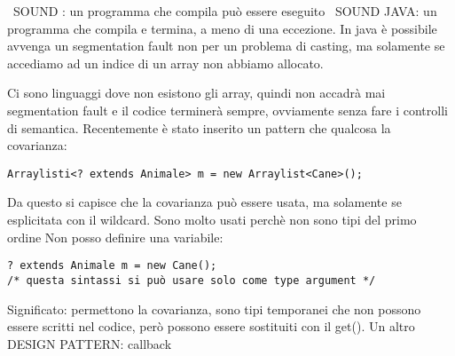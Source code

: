 \noindent \textbullet\ SOUND : un programma che compila può essere eseguito \newline
\textbullet\ SOUND JAVA: un programma che compila e termina, a meno di una eccezione. \newline
In java è possibile avvenga un segmentation fault non per un problema di casting, ma solamente se accediamo ad un indice di un array non abbiamo allocato. \newline

\noindent Ci sono linguaggi dove non esistono gli array, quindi non accadrà mai segmentation fault e il codice terminerà sempre, ovviamente senza fare i controlli di semantica. \newline
Recentemente è stato inserito un pattern che qualcosa la covarianza: 

\begin{lstlisting}[basicstyle=\small,]
Arraylisti<? extends Animale> m = new Arraylist<Cane>();
\end{lstlisting}

Da questo si capisce che la covarianza può essere usata, ma solamente se esplicitata con il wildcard. \newline
Sono molto usati perchè non sono tipi del primo ordine \newline
Non posso definire una variabile: 

\begin{lstlisting}[basicstyle=\small,]
? extends Animale m = new Cane();
/* questa sintassi si può usare solo come type argument */
\end{lstlisting}
Significato: permettono la covarianza, sono tipi temporanei che non possono essere scritti nel codice, però possono essere sostituiti con il get(). \newline
Un altro DESIGN PATTERN: callback














